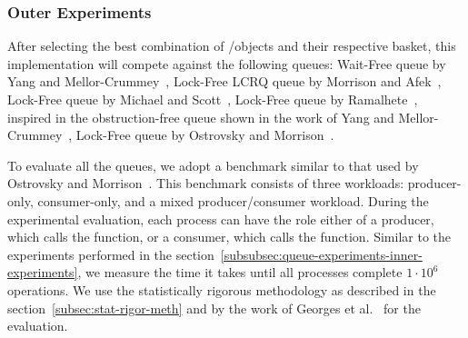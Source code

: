 \subsubsection{Outer Experiments}

After selecting the best combination of \LL/\IC objects and their respective basket, this implementation will compete against the following queues:  Wait-Free queue by Yang and Mellor-Crummey~\cite{DBLP_conf_ppopp_YangM16},  Lock-Free LCRQ queue by Morrison and Afek~\cite{ppopp2013x86queues}, Lock-Free queue by Michael and Scott~\cite{DBLP_conf_podc_MichaelS96}, Lock-Free queue by Ramalhete~\cite{Ramalhete_Correia_MPMC_2016}, inspired in the obstruction-free queue shown in the work of Yang and Mellor-Crummey~\cite{DBLP_conf_ppopp_YangM16}, Lock-Free queue by Ostrovsky and Morrison~\cite{scalingconcurrent2020}.

To evaluate all the queues, we adopt a benchmark similar to that used by Ostrovsky and Morrison~\cite{scalingconcurrent2020}. This benchmark consists of three workloads: producer-only, consumer-only, and a mixed producer/consumer workload. During the experimental evaluation, each process can have the role either of a producer, which calls the \Enq function, or a consumer, which calls the \Deq function. Similar to the experiments performed in the section~\ref{subsubsec:queue-experiments-inner-experiments}, we measure the time it takes until all processes complete \(1\cdot 10^6\) operations. We use the statistically rigorous methodology as described in the section~\ref{subsec:stat-rigor-meth} and by the work of Georges et al.~\cite{DBLP_conf_oopsla_GeorgesBE07} for the evaluation.
